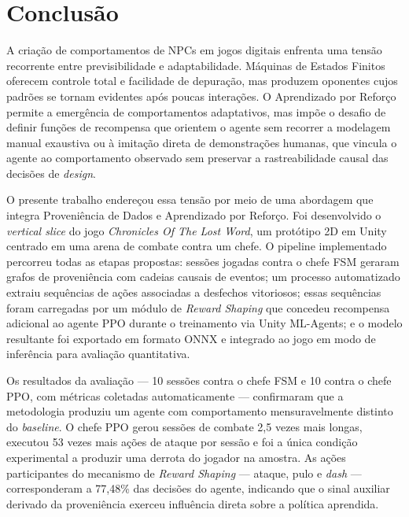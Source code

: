 \chapter{Conclusão}
\label{cap:conclusao}

A criação de comportamentos de NPCs em jogos digitais enfrenta uma tensão
recorrente entre previsibilidade e adaptabilidade. Máquinas de Estados Finitos
oferecem controle total e facilidade de depuração, mas produzem oponentes cujos
padrões se tornam evidentes após poucas interações. O Aprendizado por Reforço
permite a emergência de comportamentos adaptativos, mas impõe o desafio de
definir funções de recompensa que orientem o agente sem recorrer a modelagem
manual exaustiva ou à imitação direta de demonstrações humanas, que vincula o
agente ao comportamento observado sem preservar a rastreabilidade causal das
decisões de \textit{design}.

O presente trabalho endereçou essa tensão por meio de uma abordagem que
integra Proveniência de Dados e Aprendizado por Reforço. Foi desenvolvido o
\textit{vertical slice} do jogo \textit{Chronicles Of The Lost Word}, um
protótipo 2D em Unity centrado em uma arena de combate contra um chefe. O
pipeline implementado percorreu todas as etapas propostas: sessões jogadas
contra o chefe FSM geraram grafos de proveniência com cadeias causais de
eventos; um processo automatizado extraiu sequências de ações associadas a
desfechos vitoriosos; essas sequências foram carregadas por um módulo de
\textit{Reward Shaping} que concedeu recompensa adicional ao agente PPO
durante o treinamento via Unity ML-Agents; e o modelo resultante foi exportado
em formato ONNX e integrado ao jogo em modo de inferência para avaliação
quantitativa.

Os resultados da avaliação --- 10 sessões contra o chefe FSM e 10 contra o
chefe PPO, com métricas coletadas automaticamente --- confirmaram que a
metodologia produziu um agente com comportamento mensuravelmente distinto do
\textit{baseline}. O chefe PPO gerou sessões de combate 2,5 vezes mais longas,
executou 53 vezes mais ações de ataque por sessão e foi a única condição
experimental a produzir uma derrota do jogador na amostra. As ações
participantes do mecanismo de \textit{Reward Shaping} --- ataque, pulo e
\textit{dash} --- corresponderam a 77,48\% das decisões do agente, indicando
que o sinal auxiliar derivado da proveniência exerceu influência direta sobre
a política aprendida.

